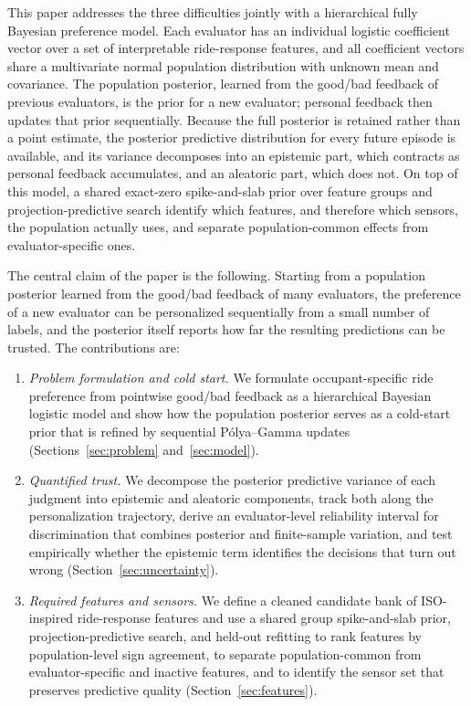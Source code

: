 \documentclass[lettersize,journal]{IEEEtran}
\begin{document}
This paper addresses the three difficulties jointly with a hierarchical fully Bayesian preference model. Each evaluator has an individual logistic coefficient vector over a set of interpretable ride-response features, and all coefficient vectors share a multivariate normal population distribution with unknown mean and covariance. The population posterior, learned from the good/bad feedback of previous evaluators, is the prior for a new evaluator; personal feedback then updates that prior sequentially. Because the full posterior is retained rather than a point estimate, the posterior predictive distribution for every future episode is available, and its variance decomposes into an epistemic part, which contracts as personal feedback accumulates, and an aleatoric part, which does not. On top of this model, a shared exact-zero spike-and-slab prior over feature groups and projection-predictive search identify which features, and therefore which sensors, the population actually uses, and separate population-common effects from evaluator-specific ones.

The central claim of the paper is the following. Starting from a population posterior learned from the good/bad feedback of many evaluators, the preference of a new evaluator can be personalized sequentially from a small number of labels, and the posterior itself reports how far the resulting predictions can be trusted. The contributions are:

\begin{enumerate}
  \item \emph{Problem formulation and cold start.} We formulate occupant-specific ride preference from pointwise good/bad feedback as a hierarchical Bayesian logistic model and show how the population posterior serves as a cold-start prior that is refined by sequential P\'{o}lya--Gamma updates (Sections~\ref{sec:problem} and~\ref{sec:model}).
  \item \emph{Quantified trust.} We decompose the posterior predictive variance of each judgment into epistemic and aleatoric components, track both along the personalization trajectory, derive an evaluator-level reliability interval for discrimination that combines posterior and finite-sample variation, and test empirically whether the epistemic term identifies the decisions that turn out wrong (Section~\ref{sec:uncertainty}).
  \item \emph{Required features and sensors.} We define a cleaned candidate bank of ISO-inspired ride-response features and use a shared group spike-and-slab prior, projection-predictive search, and held-out refitting to rank features by population-level sign agreement, to separate population-common from evaluator-specific and inactive features, and to identify the sensor set that preserves predictive quality (Section~\ref{sec:features}).
\end{enumerate}
\end{document}
